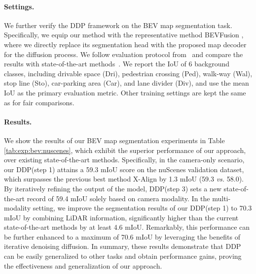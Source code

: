 \documentclass[10pt,twocolumn,letterpaper]{article}
\newcommand{\ours}[0]{DDP\xspace}
\begin{document}
\paragraph{Settings.}
We further verify the \ours framework on the BEV map segmentation task.
Specifically, we equip our method with the representative method BEVFusion \cite{liu2022bevfusion}, where we directly replace its segmentation head with the proposed map decoder for the diffusion process.
We follow evaluation protocol from~\cite{liu2022bevfusion} and compare the results with state-of-the-art methods~\cite{xie2022m2bev, yin2021multimodal, liu2022bevfusion, borse2023x}.
We report the IoU of 6 background classes, including drivable space (Dri), pedestrian crossing (Ped), walk-way (Wal), stop line (Sto), car-parking area (Car), and lane divider (Div), and use the mean IoU as the primary evaluation metric.
Other training settings are kept the same as \cite{liu2022bevfusion} for fair comparisons.

\paragraph{Results.} 
We show the results of our BEV map segmentation experiments in Table \ref{tab:exp:bev:nuscenes}, which exhibit the superior performance of our approach, over existing state-of-the-art methods.
Specifically, in the camera-only scenario, our \ours (step 1) attains a 59.3 mIoU score on the nuScenes validation dataset, which surpasses the previous best method X-Align \cite{borse2023x} by 1.3 mIoU (59.3 \emph{vs.} 58.0). 
By iteratively refining the output of the model, \ours (step 3) sets a new state-of-the-art record of 59.4 mIoU solely based on camera modality.
In the multi-modality setting, we improve the segmentation results of our \ours (step 1) to 70.3 mIoU by combining LiDAR information, significantly higher than the current state-of-the-art methods \cite{liu2022bevfusion, borse2023x} by at least 4.6 mIoU. Remarkably, this performance can be further enhanced to a maximum of 70.6 mIoU by leveraging the benefits of iterative denoising diffusion.
In summary, these results demonstrate that \ours can be easily generalized to other tasks and obtain performance gains, proving the effectiveness and generalization of our approach.
\end{document}
